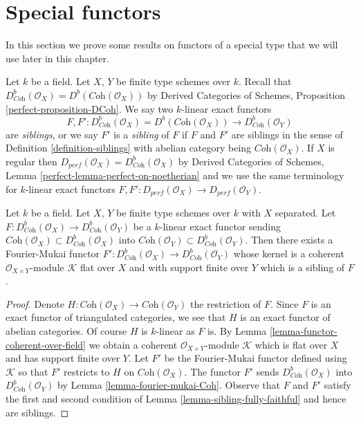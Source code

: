 \section{Special functors}
\label{section-special-functors}

\noindent
In this section we prove some results on functors of a special type
that we will use later in this chapter.

\begin{definition}
\label{definition-siblings-geometric}
Let $k$ be a field. Let $X$, $Y$ be finite type schemes over $k$.
Recall that
$D^b_{\textit{Coh}}(\mathcal{O}_X) = D^b(\textit{Coh}(\mathcal{O}_X))$
by Derived Categories of Schemes, Proposition \ref{perfect-proposition-DCoh}.
We say two $k$-linear exact functors
$$
F, F' :
D^b_{\textit{Coh}}(\mathcal{O}_X) = D^b(\textit{Coh}(\mathcal{O}_X))
\longrightarrow
D^b_{\textit{Coh}}(\mathcal{O}_Y)
$$
are {\it siblings}, or we say $F'$ is a {\it sibling} of $F$ if $F$ and $F'$
are siblings in the sense of Definition \ref{definition-siblings}
with abelian category being $\textit{Coh}(\mathcal{O}_X)$.
If $X$ is regular then
$D_{perf}(\mathcal{O}_X) = D^b_{\textit{Coh}}(\mathcal{O}_X)$ by
Derived Categories of Schemes, Lemma \ref{perfect-lemma-perfect-on-noetherian}
and we use the same terminology for $k$-linear exact functors
$F, F' : D_{perf}(\mathcal{O}_X) \to D_{perf}(\mathcal{O}_Y)$.
\end{definition}

\begin{lemma}
\label{lemma-exact-functor-preserving-Coh}
Let $k$ be a field. Let $X$, $Y$ be finite type schemes over $k$ with
$X$ separated. Let
$F : D^b_{\textit{Coh}}(\mathcal{O}_X) \to D^b_{\textit{Coh}}(\mathcal{O}_Y)$
be a $k$-linear exact functor sending
$\textit{Coh}(\mathcal{O}_X) \subset D^b_{\textit{Coh}}(\mathcal{O}_X)$
into
$\textit{Coh}(\mathcal{O}_Y) \subset D^b_{\textit{Coh}}(\mathcal{O}_Y)$.
Then there exists a Fourier-Mukai functor
$F' : D^b_{\textit{Coh}}(\mathcal{O}_X) \to D^b_{\textit{Coh}}(\mathcal{O}_Y)$
whose kernel is a coherent $\mathcal{O}_{X \times Y}$-module $\mathcal{K}$
flat over $X$ and with support finite over $Y$ which is a sibling of $F$.
\end{lemma}

\begin{proof}
Denote $H : \textit{Coh}(\mathcal{O}_X) \to \textit{Coh}(\mathcal{O}_Y)$
the restriction of $F$. Since $F$ is an exact functor of triangulated
categories, we see that $H$ is an exact functor of abelian categories.
Of course $H$ is $k$-linear as $F$ is. By
Lemma \ref{lemma-functor-coherent-over-field}
we obtain a coherent $\mathcal{O}_{X \times Y}$-module
$\mathcal{K}$ which is flat over $X$ and has support finite over $Y$.
Let $F'$ be the Fourier-Mukai functor defined using $\mathcal{K}$
so that $F'$ restricts to $H$ on $ \textit{Coh}(\mathcal{O}_X)$.
The functor $F'$ sends $D^b_{\textit{Coh}}(\mathcal{O}_X)$
into $D^b_{\textit{Coh}}(\mathcal{O}_Y)$ by
Lemma \ref{lemma-fourier-mukai-Coh}.
Observe that $F$ and $F'$ satisfy the first and second
condition of Lemma \ref{lemma-sibling-fully-faithful} and hence are siblings.
\end{proof}

